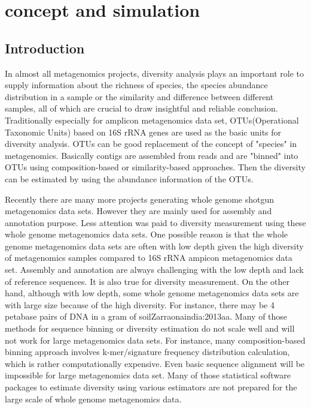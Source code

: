 \chapter{concept and simulation}



\section{Introduction}

In almost all  metagenomics projects, diversity analysis plays an important
role to supply information about the richness of species, the species abundance
distribution in a sample or the similarity and difference between different 
samples, all of which are crucial to draw insightful and reliable conclusion. 
Traditionally especially for amplicon metagenomics data set, OTUs(Operational 
Taxonomic Units) based on 16S rRNA genes are used as the basic units for 
diversity analysis. OTUs can be good replacement of the concept of "species" in 
metagenomics. Basically contigs are assembled from reads and are "binned" into
OTUs using composition-based or similarity-based approaches. Then the diversity
can be estimated by using the abundance information of the OTUs.

Recently there are many more projects generating whole genome shotgun metagenomics data sets. However they are 
mainly used for assembly and annotation purpose. Less attention was paid to diversity measurement
using these whole genome metagenomics data sets. One possible reason is that the whole genome metagenomics
data sets are often with low depth given the high diversity of metagenomics samples compared to 16S rRNA
ampicon metagenomics data set. Assembly and annotation are always challenging with the low depth and lack of 
reference sequences. It is also true for diversity measurement. On the other hand, although with low depth, some whole genome metagenomics 
data sets are with large size because of the high diversity. For instance, there may be 4 petabase
pairs of DNA in a gram of soil{Zarraonaindia:2013aa}. Many of those methods for sequence binning or diversity 
estimation do not scale well and will not work for large metagenomics data sets. For instance,
many composition-based binning approach involves k-mer/signature frequency distribution calculation, which is 
rather computationally expensive. Even basic sequence alignment will be impossible for large metagenomics data set.
Many of those statistical software packages to estimate diversity using various estimators are not prepared 
for the large scale of whole genome metagenomics data. 

